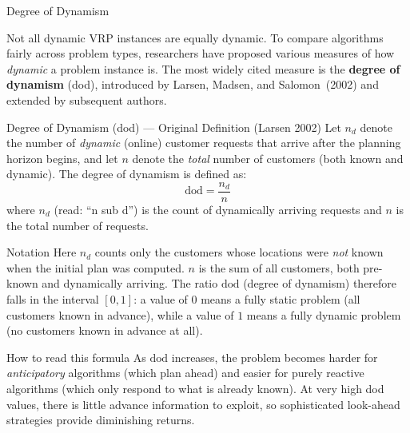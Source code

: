 \documentclass[aspectratio=169,10pt]{beamer}
\begin{document}
\begin{frame}[allowframebreaks]{Degree of Dynamism}

  Not all dynamic VRP instances are equally dynamic.  To compare algorithms
  fairly across problem types, researchers have proposed various measures of
  how \emph{dynamic} a problem instance is.  The most widely cited measure is
  the \textbf{degree of dynamism} (dod), introduced by Larsen, Madsen, and
  Salomon~(2002) and extended by subsequent authors.

  \begin{block}{Degree of Dynamism (dod) — Original Definition (Larsen 2002)}
    Let $n_d$ denote the number of \emph{dynamic} (online) customer requests
    that arrive after the planning horizon begins, and let $n$ denote the
    \emph{total} number of customers (both known and dynamic).
    The degree of dynamism is defined as:
    \[
      \mathrm{dod} = \frac{n_d}{n}
    \]
    where $n_d$ (read: ``n sub d'') is the count of dynamically arriving
    requests and $n$ is the total number of requests.
  \end{block}

  \begin{block}{Notation}
    Here $n_d$ counts only the customers whose locations were \emph{not} known
    when the initial plan was computed.  $n$ is the sum of all customers,
    both pre-known and dynamically arriving.
    The ratio $\mathrm{dod}$ (degree of dynamism) therefore falls in the
    interval $[0, 1]$: a value of $0$ means a fully static problem
    (all customers known in advance), while a value of $1$ means a fully
    dynamic problem (no customers known in advance at all).
  \end{block}

  \begin{alertblock}{How to read this formula}
    As $\mathrm{dod}$ increases, the problem becomes harder for \emph{anticipatory}
    algorithms (which plan ahead) and easier for purely reactive algorithms
    (which only respond to what is already known).  At very high dod values,
    there is little advance information to exploit, so sophisticated
    look-ahead strategies provide diminishing returns.
  \end{alertblock}

  \framebreak


\end{frame}
\end{document}
